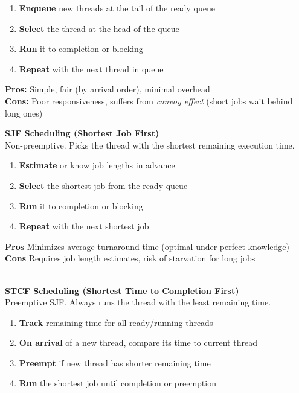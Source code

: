 \documentclass[8pt]{extarticle}
\begin{document}
\begin{minipage}[t]{0.5\textwidth}
\begin{minipage}[t]{0.48\textwidth}
        \begin{enumerate}[noitemsep,topsep=0pt]
            \item \textbf{Enqueue} new threads at the tail of the ready queue
            \item \textbf{Select} the thread at the head of the queue
            \item \textbf{Run} it to completion or blocking
            \item \textbf{Repeat} with the next thread in queue
        \end{enumerate}
        \noindent\textbf{Pros:} Simple, fair (by arrival order), minimal overhead \\
        \noindent\textbf{Cons:} Poor responsiveness, suffers from \textit{convoy effect} (short jobs wait behind long ones)\\
        \end{minipage}
        \hfill
        \begin{minipage}[t]{0.48\textwidth}
        \noindent\textbf{SJF Scheduling (Shortest Job First)} \\
        Non-preemptive. Picks the thread with the shortest remaining execution time.
        \begin{enumerate}[noitemsep,topsep=0pt]
            \item \textbf{Estimate} or know job lengths in advance
            \item \textbf{Select} the shortest job from the ready queue
            \item \textbf{Run} it to completion or blocking
            \item \textbf{Repeat} with the next shortest job
        \end{enumerate}
        \vspace{4px}
        \noindent\textbf{Pros} Minimizes average turnaround time (optimal under perfect knowledge) \\
        \noindent\textbf{Cons} Requires job length estimates, risk of starvation for long jobs\\
        \end{minipage}\\
        \noindent\textbf{STCF Scheduling (Shortest Time to Completion First)} \\
        Preemptive SJF. Always runs the thread with the least remaining time.
        \begin{enumerate}[noitemsep,topsep=0pt]
            \item \textbf{Track} remaining time for all ready/running threads
            \item \textbf{On arrival} of a new thread, compare its time to current thread
            \item \textbf{Preempt} if new thread has shorter remaining time
            \item \textbf{Run} the shortest job until completion or preemption
        \end{enumerate}


\end{minipage}
\end{document}
